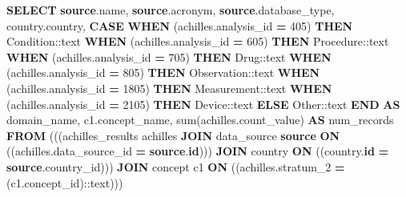 \documentclass[
]{book}
\newenvironment{Shaded}{\begin{snugshade}}{\end{snugshade}}
\newcommand{\CharTok}[1]{\textcolor[rgb]{0.31,0.60,0.02}{#1}}
\newcommand{\ControlFlowTok}[1]{\textcolor[rgb]{0.13,0.29,0.53}{\textbf{#1}}}
\newcommand{\DecValTok}[1]{\textcolor[rgb]{0.00,0.00,0.81}{#1}}
\newcommand{\FunctionTok}[1]{\textcolor[rgb]{0.00,0.00,0.00}{#1}}
\newcommand{\KeywordTok}[1]{\textcolor[rgb]{0.13,0.29,0.53}{\textbf{#1}}}
\newcommand{\NormalTok}[1]{#1}
\newcommand{\OperatorTok}[1]{\textcolor[rgb]{0.81,0.36,0.00}{\textbf{#1}}}
\newcommand{\StringTok}[1]{\textcolor[rgb]{0.31,0.60,0.02}{#1}}
\begin{document}
\begin{Shaded}
\begin{Highlighting}[]
\KeywordTok{SELECT} \KeywordTok{source}\NormalTok{.name,}
   \KeywordTok{source}\NormalTok{.acronym,}
   \KeywordTok{source}\NormalTok{.database\_type,}
\NormalTok{   country.country,}
       \ControlFlowTok{CASE}
           \ControlFlowTok{WHEN}\NormalTok{ (achilles.analysis\_id }\OperatorTok{=} \DecValTok{405}\NormalTok{)}
             \ControlFlowTok{THEN} \StringTok{\textquotesingle{}Condition\textquotesingle{}}\NormalTok{:}\CharTok{:text}
           \ControlFlowTok{WHEN}\NormalTok{ (achilles.analysis\_id }\OperatorTok{=} \DecValTok{605}\NormalTok{)}
             \ControlFlowTok{THEN} \StringTok{\textquotesingle{}Procedure\textquotesingle{}}\NormalTok{:}\CharTok{:text}
           \ControlFlowTok{WHEN}\NormalTok{ (achilles.analysis\_id }\OperatorTok{=} \DecValTok{705}\NormalTok{)}
             \ControlFlowTok{THEN} \StringTok{\textquotesingle{}Drug\textquotesingle{}}\NormalTok{:}\CharTok{:text}
           \ControlFlowTok{WHEN}\NormalTok{ (achilles.analysis\_id }\OperatorTok{=} \DecValTok{805}\NormalTok{)}
             \ControlFlowTok{THEN} \StringTok{\textquotesingle{}Observation\textquotesingle{}}\NormalTok{:}\CharTok{:text}
           \ControlFlowTok{WHEN}\NormalTok{ (achilles.analysis\_id }\OperatorTok{=} \DecValTok{1805}\NormalTok{)}
             \ControlFlowTok{THEN} \StringTok{\textquotesingle{}Measurement\textquotesingle{}}\NormalTok{:}\CharTok{:text}
           \ControlFlowTok{WHEN}\NormalTok{ (achilles.analysis\_id }\OperatorTok{=} \DecValTok{2105}\NormalTok{)}
             \ControlFlowTok{THEN} \StringTok{\textquotesingle{}Device\textquotesingle{}}\NormalTok{:}\CharTok{:text}
           \ControlFlowTok{ELSE} \StringTok{\textquotesingle{}Other\textquotesingle{}}\NormalTok{:}\CharTok{:text}
       \ControlFlowTok{END} \KeywordTok{AS}\NormalTok{ domain\_name,}
\NormalTok{   c1.concept\_name,}
   \FunctionTok{sum}\NormalTok{(achilles.count\_value) }\KeywordTok{AS}\NormalTok{ num\_records}
  \KeywordTok{FROM}\NormalTok{ (((achilles\_results achilles}
    \KeywordTok{JOIN}\NormalTok{ data\_source }\KeywordTok{source}
      \KeywordTok{ON}\NormalTok{ ((achilles.data\_source\_id }\OperatorTok{=} \KeywordTok{source}\NormalTok{.}\KeywordTok{id}\NormalTok{)))}
    \KeywordTok{JOIN}\NormalTok{ country }\KeywordTok{ON}\NormalTok{ ((country.}\KeywordTok{id} \OperatorTok{=} \KeywordTok{source}\NormalTok{.country\_id)))}
    \KeywordTok{JOIN}\NormalTok{ concept c1}
      \KeywordTok{ON}\NormalTok{ ((achilles.stratum\_2 }\OperatorTok{=}\NormalTok{ (c1.concept\_id):}\CharTok{:text}\NormalTok{)))}

\end{Highlighting}
\end{Shaded}
\end{document}
